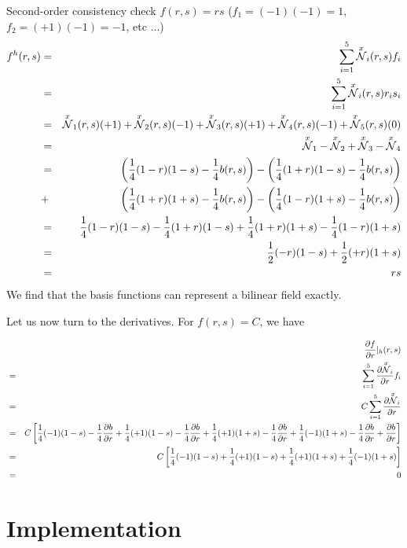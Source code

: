 Second-order consistency check $f(r,s)=rs$ ($f_1=(-1)(-1)=1$, $f_2=(+1)(-1)=-1$, etc ...)
\begin{eqnarray}
f^h(r,s) 
&=& \sum_{i=1}^5 \overset{x}{{\mathcal{N}}}_i(r,s) f_i \nonumber\\
&=& \sum_{i=1}^5 \overset{x}{{\mathcal{N}}}_i(r,s) r_i s_i \nonumber\\
&=& \overset{x}{{\mathcal{N}}}_1(r,s) (+1) + \overset{x}{{\mathcal{N}}}_2(r,s) (-1) + \overset{x}{{\mathcal{N}}}_3(r,s) (+1) + \overset{x}{{\mathcal{N}}}_4(r,s) (-1) + \overset{x}{{\mathcal{N}}}_5(r,s) (0) \nonumber\\
&=& \overset{x}{{\mathcal{N}}}_1-\overset{x}{{\mathcal{N}}}_2+\overset{x}{{\mathcal{N}}}_3-\overset{x}{{\mathcal{N}}}_4 \nonumber\\
&=& 
\left(\frac{1}{4}(1-r)(1-s)-\frac{1}{4}b(r,s)\right)
-\left(\frac{1}{4}(1+r)(1-s)-\frac{1}{4}b(r,s)\right) \nonumber\\
&+& 
\left(\frac{1}{4}(1+r)(1+s)-\frac{1}{4}b(r,s)\right)
-\left(\frac{1}{4}(1-r)(1+s)-\frac{1}{4}b(r,s)\right) \nonumber\\
&=& 
 \frac{1}{4}(1-r)(1-s)
-\frac{1}{4}(1+r)(1-s)
+\frac{1}{4}(1+r)(1+s)
-\frac{1}{4}(1-r)(1+s) \nonumber\\
&=&
 \frac{1}{2}(-r)(1-s)
+\frac{1}{2}(+r)(1+s) \nonumber\\
&=& rs
\end{eqnarray}
We find that the basis functions can represent  a bilinear field exactly.

Let us now turn to the derivatives. 
For $f(r,s)=C$, we have

\begin{eqnarray}
&&\frac{\partial f}{\partial r}|_h(r,s) \nonumber\\
&=& \sum_{i=1}^5 \frac{\partial \overset{x}{{\mathcal{N}}}_i}{\partial r} f_i \nonumber\\ 
&=& C \sum_{i=1}^5 \frac{\partial \overset{x}{{\mathcal{N}}}_i}{\partial r} \nonumber\\
&=&  C \left[ 
\frac14(-1)(1-s) -\frac14 \frac{\partial b}{\partial r} + 
\frac14(+1)(1-s) -\frac14 \frac{\partial b}{\partial r} + 
\frac14(+1)(1+s) -\frac14 \frac{\partial b}{\partial r} + 
\frac14(-1)(1+s) -\frac14 \frac{\partial b}{\partial r} + 
\frac{\partial b}{\partial r} \right] \nonumber\\
&=& C \left[ 
\frac14(-1)(1-s)  + 
\frac14(+1)(1-s)  + 
\frac14(+1)(1+s)  + 
\frac14(-1)(1+s)   \right] \nonumber\\
&=& 0
\end{eqnarray}




\section*{Implementation}

